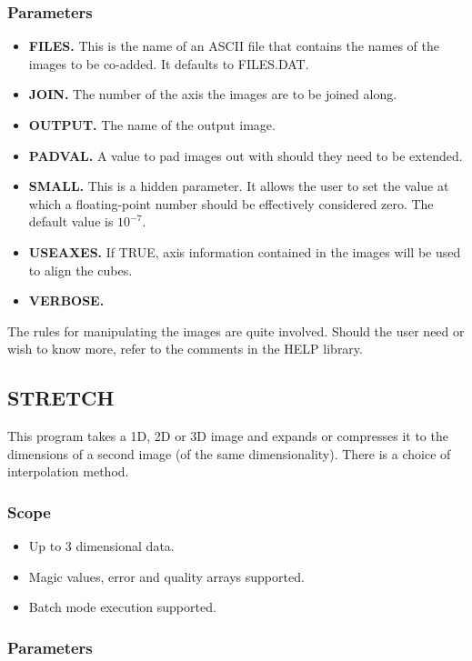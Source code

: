 \subsubsection{Parameters}

\begin{itemize}
\item {\bf FILES.} This is the name of an ASCII file that contains the names of
the images to be co-added. It defaults to FILES.DAT.
\item {\bf JOIN.} The number of the axis the images are to be joined along.
\item {\bf OUTPUT.} The name of the output image.
\item {\bf PADVAL.} A value to pad images out with should they need to be 
extended.
\item {\bf SMALL.} This is a hidden parameter. It allows the user to set the
value at which a floating-point number should be effectively considered zero.
The default value is $10^{-7}$.
\item {\bf USEAXES.} If TRUE, axis information contained in the images will be
used to align the cubes.
\item {\bf VERBOSE.}
\end{itemize}

The rules for manipulating the images are quite involved. Should the user need
or wish to know more, refer to the comments in the HELP library. 

\subsection{STRETCH}

This program takes a 1D, 2D or 3D image and expands or compresses it to the
dimensions of a second image (of the same dimensionality). There is a choice of
interpolation method.

\subsubsection{Scope}

\begin{itemize}
\item Up to 3 dimensional data. 
\item Magic values, error and quality arrays supported.
\item Batch mode execution supported.
\end {itemize}

\subsubsection{Parameters}

